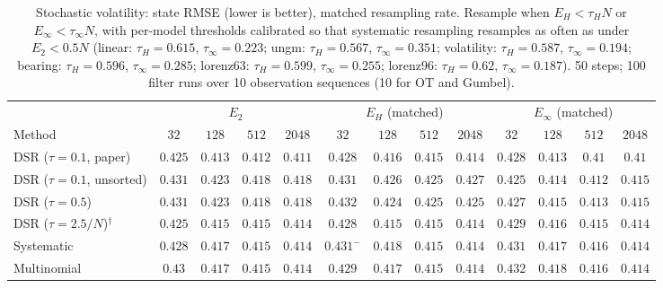 \begin{table}[ht]
\centering
\small
\caption{Stochastic volatility: state RMSE (lower is better), matched resampling rate. Resample when $E_H<\tau_HN$ or $E_\infty<\tau_\infty N$, with per-model thresholds calibrated so that systematic resampling resamples as often as under $E_2<0.5N$ (linear: $\tau_H{=}0.615$, $\tau_\infty{=}0.223$; ungm: $\tau_H{=}0.567$, $\tau_\infty{=}0.351$; volatility: $\tau_H{=}0.587$, $\tau_\infty{=}0.194$; bearing: $\tau_H{=}0.596$, $\tau_\infty{=}0.285$; lorenz63: $\tau_H{=}0.599$, $\tau_\infty{=}0.255$; lorenz96: $\tau_H{=}0.62$, $\tau_\infty{=}0.187$). 50 steps; 100 filter runs over 10 observation sequences (10 for OT and Gumbel).}
\label{tab:trigger-matched-volatility-rmse}
\begin{adjustbox}{max width=\linewidth}
\begin{tabular}{lcccc|cccc|cccc}
\toprule
 & \multicolumn{4}{c}{$E_2$} & \multicolumn{4}{c}{$E_H$ (matched)} & \multicolumn{4}{c}{$E_\infty$ (matched)} \\
\cmidrule(lr){2-5} \cmidrule(lr){6-9} \cmidrule(lr){10-13}
Method & $32$ & $128$ & $512$ & $2048$ & $32$ & $128$ & $512$ & $2048$ & $32$ & $128$ & $512$ & $2048$ \\
\midrule
DSR ($\tau{=}0.1$, paper) & $\mathbf{0.425}$ & $\mathbf{0.413}$ & $0.412$ & $0.411$ & $0.428$ & $0.416$ & $0.415$ & $0.414$ & $0.428$ & $0.413$ & $\mathbf{0.41}$ & $\mathbf{0.41}$ \\
DSR ($\tau{=}0.1$, unsorted) & $0.431$ & $0.423$ & $0.418$ & $0.418$ & $0.431$ & $0.426$ & $0.425$ & $0.427$ & $\mathbf{0.425}$ & $\mathbf{0.414}$ & $\mathbf{0.412}$ & $\mathbf{0.415}$ \\
DSR ($\tau{=}0.5$) & $0.431$ & $0.423$ & $0.418$ & $0.418$ & $0.432$ & $0.424$ & $0.425$ & $0.425$ & $\mathbf{0.427}$ & $\mathbf{0.415}$ & $\mathbf{0.413}$ & $\mathbf{0.415}$ \\
DSR ($\tau{=}2.5/N$)$^\dagger$ & $\mathbf{0.425}$ & $\mathbf{0.415}$ & $\mathbf{0.415}$ & $0.414$ & $0.428$ & $0.415$ & $0.415$ & $\mathbf{0.414}$ & $0.429$ & $0.416$ & $0.415$ & $0.414$ \\
\midrule
Systematic & $\mathbf{0.428}$ & $\mathbf{0.417}$ & $0.415$ & $\mathbf{0.414}$ & $0.431^{-}$ & $0.418$ & $\mathbf{0.415}$ & $0.414$ & $0.431$ & $0.417$ & $0.416$ & $0.414$ \\
Multinomial & $0.43$ & $0.417$ & $0.415$ & $0.414$ & $\mathbf{0.429}$ & $\mathbf{0.417}$ & $\mathbf{0.415}$ & $\mathbf{0.414}$ & $0.432$ & $0.418$ & $0.416$ & $0.414$ \\

\end{tabular}
\end{adjustbox}
\end{table}
